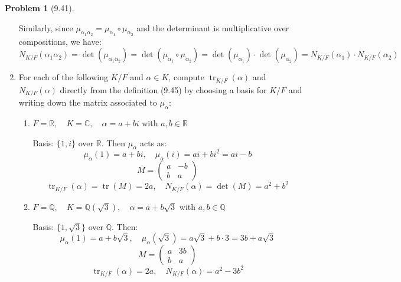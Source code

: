 \documentclass[12pt]{article}
\theoremstyle{definition}
\newtheorem{problem}{Problem}
\DeclareMathOperator{\tr}{tr}
\begin{document}
\begin{problem}[9.41]
\begin{enumerate}[label=(\alph*)]
\begin{solution}
            Similarly, since $\mu_{\alpha_1 \alpha_2} = \mu_{\alpha_1} \circ \mu_{\alpha_2}$ and the determinant is multiplicative over compositions, we have:
            \[
                N_{K/F}(\alpha_1 \alpha_2) = \det(\mu_{\alpha_1 \alpha_2}) = \det(\mu_{\alpha_1} \circ \mu_{\alpha_2}) = \det(\mu_{\alpha_1}) \cdot \det(\mu_{\alpha_2}) = N_{K/F}(\alpha_1) \cdot N_{K/F}(\alpha_2)
            \]
        \end{solution}

        \item For each of the following $K/F$ and $\alpha \in K$, compute $\tr_{K/F}(\alpha)$ and $N_{K/F}(\alpha)$
              directly from the definition (9.45) by choosing a basis for $K/F$ and writing down the matrix associated to $\mu_\alpha$:
              \begin{enumerate}[label=(\arabic*)]
                \item $F = \mathbb{R}, \quad K = \mathbb{C}, \quad \alpha = a + bi$ with $a,b \in \mathbb{R}$
                
                \begin{solution}
                    Basis: $\{1, i\}$ over $\mathbb{R}$. Then $\mu_\alpha$ acts as:
                    \[
                        \mu_\alpha(1) = a + bi, \quad \mu_\alpha(i) = ai + b i^2 = ai - b
                    \]
                    \[
                        M = \begin{pmatrix}
                            a & -b \\
                            b & a
                        \end{pmatrix}
                    \]
                    \[
                        \tr_{K/F}(\alpha) = \operatorname{tr}(M) = 2a, \quad N_{K/F}(\alpha) = \det(M) = a^2 + b^2
                    \]
                \end{solution}

                \item $F = \mathbb{Q}, \quad K = \mathbb{Q}(\sqrt{3}), \quad \alpha = a + b\sqrt{3}$ with $a,b \in \mathbb{Q}$
                
                \begin{solution}
                    Basis: $\{1, \sqrt{3}\}$ over $\mathbb{Q}$. Then:
                    \[
                        \mu_\alpha(1) = a + b\sqrt{3}, \quad \mu_\alpha(\sqrt{3}) = a\sqrt{3} + b \cdot 3 = 3b + a\sqrt{3}
                    \]
                    \[
                        M = \begin{pmatrix}
                            a & 3b \\
                            b & a
                        \end{pmatrix}
                    \]
                    \[
                        \tr_{K/F}(\alpha) = 2a, \quad N_{K/F}(\alpha) = a^2 - 3b^2
                    \]
                \end{solution}


\end{enumerate}
\end{enumerate}
\end{problem}
\end{document}
